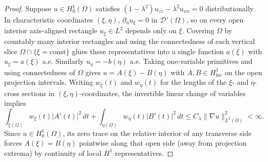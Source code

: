 \documentclass[11pt,reqno]{amsart}
\theoremstyle{definition}
\theoremstyle{remark}
\begin{document}
\begin{proof}
Suppose $u \in H_0^1(\Omega)$ satisfies $(1-\lambda^2)u_{zz} - \lambda^2 u_{xx} = 0$ distributionally. In characteristic coordinates $(\xi,\eta)$, $\partial_\eta u_\xi = 0$ in $\mathcal{D}'(\Omega)$, so on every open interior axis-aligned rectangle $u_\xi \in L^2$ depends only on $\xi$. Covering $\Omega$ by countably many interior rectangles and using the connectedness of each vertical slice $\Omega \cap \{\xi = \text{const}\}$ glues these representatives into a single function $a(\xi)$ with $u_\xi = a(\xi)$ a.e. Similarly $u_\eta = -b(\eta)$ a.e. Taking one-variable primitives and using connectedness of $\Omega$ gives $u = A(\xi) - B(\eta)$ with $A, B \in H^1_{\mathrm{loc}}$ on the open projection intervals. Writing $w_\xi(t)$ and $w_\eta(t)$ for the lengths of the $\xi$- and $\eta$-cross sections in $(\xi,\eta)$-coordinates, the invertible linear change of variables implies
\begin{equation}\label{eq:weighted-energy}
  \int_{\xi(\Omega)} w_\xi(t) |A'(t)|^2 \, dt + \int_{\eta(\Omega)} w_\eta(t) |B'(t)|^2 \, dt \le C_\lambda \|\nabla u\|_{L^2(\Omega)}^2 < \infty.
\end{equation}
Since $u \in H_0^1(\Omega)$, its zero trace on the relative interior of any transverse side forces $A(\xi) = B(\eta)$ pointwise along that open side (away from projection extrema) by continuity of local $H^1$ representatives.


\end{proof}
\end{document}
